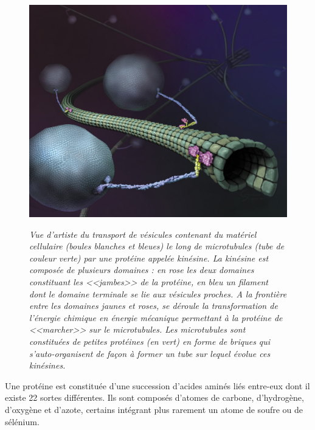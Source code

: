 \begin{figure}
  \centering
  {\includegraphics[width=0.85\linewidth]{./figures/ch1/kinesincargoart}}
    \caption{\it Vue d’artiste du transport de vésicules contenant du matériel cellulaire (boules blanches et bleues) le long de microtubules (tube de couleur verte) par une protéine appelée kinésine. La kinésine est composée de plusieurs domaines : en rose les deux domaines constituant les <<jambes>> de la protéine, en bleu un filament dont le domaine terminale se lie aux vésicules proches. A la frontière entre les domaines jaunes et roses, se déroule la transformation de l'énergie chimique en énergie mécanique permettant à la protéine de <<marcher>> sur le microtubules. Les microtubules sont constituées de petites protéines (en vert) en forme de briques qui s'auto-organisent de façon à former un tube sur lequel évolue ces kinésines.}
    \label{Fig:kinesincargoart}
  \hspace{0.3cm}
\end{figure}


Une protéine est constituée d'une succession d'acides aminés liés entre-eux dont il existe 22 sortes différentes. Ils sont composés d'atomes de carbone, d'hydrogène, d'oxygène et d'azote, certains intégrant plus rarement un atome de soufre ou de sélénium.


